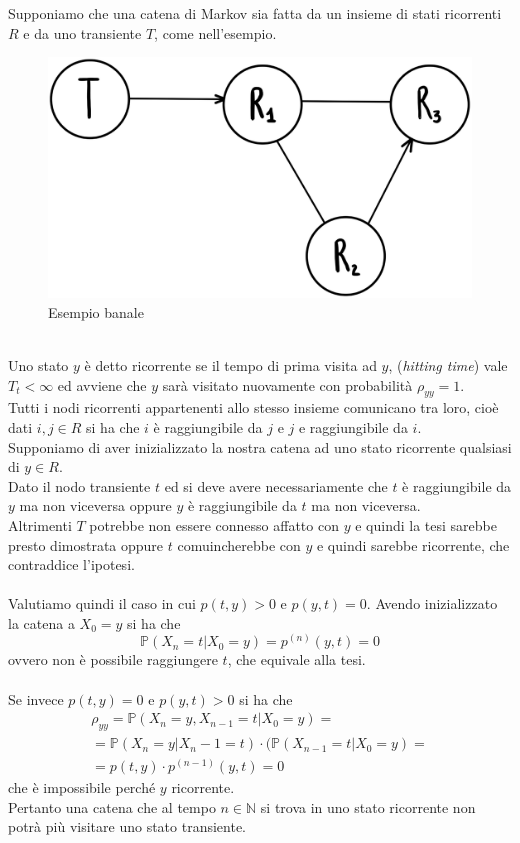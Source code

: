 \documentclass[12pt]{homework}
\begin{document}
Supponiamo che una catena di Markov sia fatta da un insieme di stati ricorrenti $R$ e da uno transiente $T$, come nell'esempio.
\begin{figure}[h]\centering
\includegraphics[scale=0.1]{Catena6.eps}
\caption{Esempio banale}
  \end{figure}
\\Uno stato $y$ è detto ricorrente se il tempo di prima visita ad $y$, (\emph{hitting time}) vale  $T_{t}<\infty$ ed avviene che $y$ sarà visitato nuovamente con probabilità $\rho_{yy}=1$.\\
Tutti i nodi ricorrenti appartenenti allo stesso insieme comunicano tra loro, cioè dati $i, j \in R$ si ha che $i$ è raggiungibile da $j$ e $j$ e raggiungibile da $i$.\\
Supponiamo di aver inizializzato la nostra catena ad uno stato ricorrente qualsiasi di $y \in R$. \\
Dato il nodo transiente $t$ ed  si deve avere necessariamente che $t$ è raggiungibile da $y$ ma non viceversa oppure $y$ è raggiungibile da $t$ ma non viceversa.\\Altrimenti $T$ potrebbe non essere connesso affatto con $y$ e quindi la tesi sarebbe presto dimostrata oppure $t$ comuincherebbe con $y$ e quindi sarebbe ricorrente, che contraddice l'ipotesi.\\\\
Valutiamo quindi il caso in cui $p(t,y) > 0$ e $p(y,t) = 0$. Avendo inizializzato la catena a $X_0 = y$ si ha che
\[\mathbb{P}(X_n= t \lvert X_0 = y) = p^{(n)}(y,t) = 0\]
ovvero non è possibile raggiungere $t$, che equivale alla tesi. \\\\
Se invece $p(t,y) = 0$ e $p(y,t) > 0$ si ha che
\begin{multline*}
\rho_{yy}=\mathbb{P}(X_n=y, X_{n-1}= t \lvert X_0 = y)=\\ = \mathbb{P}(X_n=y \lvert X_n-1 = t) \cdot(\mathbb{P}(X_{n-1} = t \lvert X_0 = y)= \\=p(t,y)\cdot p^{(n-1)}(y,t) = 0
\end{multline*}
che è impossibile perché $y$ ricorrente.\\Pertanto una catena che al tempo $n \in \mathbb{N}$ si trova in uno stato ricorrente non potrà più visitare uno stato transiente.
\end{document}
